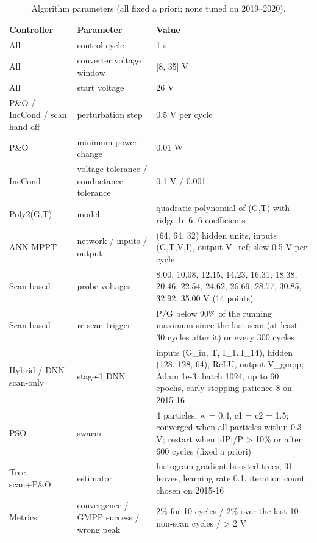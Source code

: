\begin{table}[t]
\centering
\caption{Algorithm parameters (all fixed a priori; none tuned on 2019–2020).}
\label{tab:Table_Algorithm_Parameters}
\small
\begin{tabular}{lll}
\hline
Controller & Parameter & Value \\
\hline
All & control cycle & 1 s \\
All & converter voltage window & [8, 35] V \\
All & start voltage & 26 V \\
P\&O / IncCond / scan hand-off & perturbation step & 0.5 V per cycle \\
P\&O & minimum power change & 0.01 W \\
IncCond & voltage tolerance / conductance tolerance & 0.1 V / 0.001 \\
Poly2(G,T) & model & quadratic polynomial of (G,T) with ridge 1e-6, 6 coefficients \\
ANN-MPPT & network / inputs / output & (64, 64, 32) hidden units, inputs (G,T,V,I), output V\_ref; slew 0.5 V per cycle \\
Scan-based & probe voltages & 8.00, 10.08, 12.15, 14.23, 16.31, 18.38, 20.46, 22.54, 24.62, 26.69, 28.77, 30.85, 32.92, 35.00 V (14 points) \\
Scan-based & re-scan trigger & P/G below 90\% of the running maximum since the last scan (at least 30 cycles after it) or every 300 cycles \\
Hybrid / DNN scan-only & stage-1 DNN & inputs (G\_in, T, I\_1..I\_14), hidden (128, 128, 64), ReLU, output V\_gmpp; Adam 1e-3, batch 1024, up to 60 epochs, early stopping patience 8 on 2015-16 \\
PSO & swarm & 4 particles, w = 0.4, c1 = c2 = 1.5; converged when all particles within 0.3 V; restart when |dP|/P > 10\% or after 600 cycles (fixed a priori) \\
Tree scan+P\&O & estimator & histogram gradient-boosted trees, 31 leaves, learning rate 0.1, iteration count chosen on 2015-16 \\
Metrics & convergence / GMPP success / wrong peak & 2\% for 10 cycles / 2\% over the last 10 non-scan cycles / > 2 V \\
\hline
\end{tabular}
\end{table}
